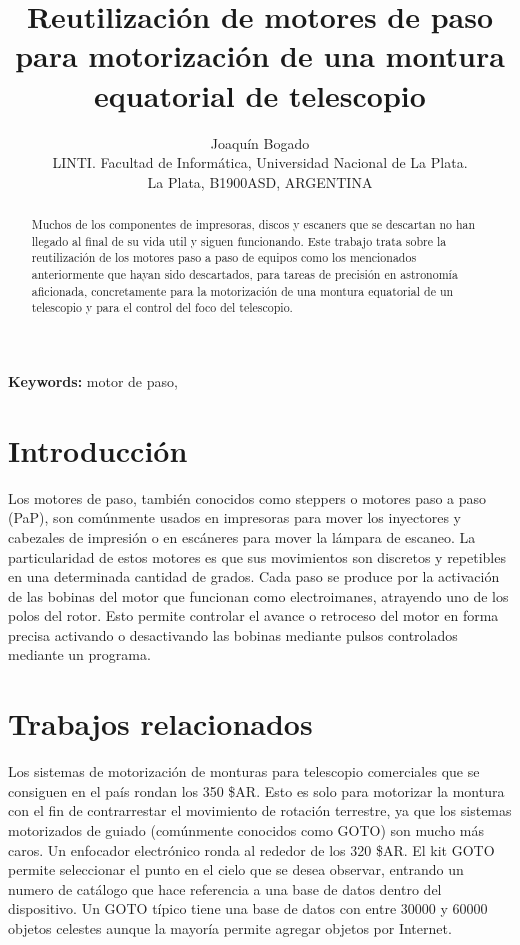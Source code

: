 \documentclass[final,narroweqnarray,inline,twoside]{ieee}
\author{Joaquín Bogado
\\LINTI. Facultad de Informática, Universidad Nacional de La Plata.
\\La Plata, B1900ASD, ARGENTINA
}
\title{Reutilización de motores de paso para motorización de una montura equatorial de telescopio}
\begin{document}
\maketitle
\sloppy

\begin{abstract}
Muchos de los componentes de impresoras, discos y escaners que se descartan no han llegado al final de su vida util y siguen
funcionando.
Este trabajo trata sobre la reutilización de los motores paso a paso de equipos como los mencionados anteriormente que hayan
sido descartados, para tareas de precisión en astronomía aficionada, concretamente para la motorización de una montura
equatorial de un telescopio y para el control del foco del telescopio.
\end{abstract}

\noindent \textbf{Keywords: } motor de paso, 

\section{Introducción}
Los motores de paso, también conocidos como steppers o motores paso a paso (PaP), son comúnmente usados en impresoras para
mover los inyectores y cabezales de impresión o en escáneres para mover la lámpara de escaneo. La particularidad de estos
motores es que sus movimientos son discretos y repetibles en una determinada cantidad de grados. Cada paso se produce por la
activación de las bobinas del motor que funcionan como electroimanes, atrayendo uno de los polos del rotor. Esto permite
controlar el avance o retroceso del motor en forma precisa activando o desactivando las bobinas mediante pulsos controlados
mediante un programa.
\section{Trabajos relacionados}
Los sistemas de motorización de monturas para telescopio comerciales que se consiguen en el país rondan los 350 \$AR. Esto
es solo para motorizar la montura con el fin de contrarrestar el movimiento de rotación terrestre, ya que los sistemas
motorizados de guiado (comúnmente conocidos como GOTO) son mucho más caros. Un enfocador electrónico ronda al rededor de los
320 \$AR. El kit GOTO permite seleccionar el punto en el cielo que se desea observar, entrando un numero de catálogo que hace
referencia a una base de datos dentro del dispositivo. Un GOTO típico tiene una base de datos con entre 30000 y 60000 objetos
celestes aunque la mayoría permite agregar objetos por Internet.
\end{document}
